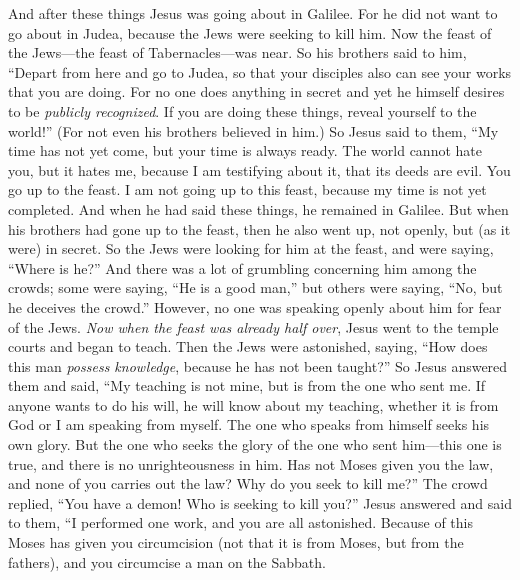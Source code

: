 \begin{biblechapter} %
 And after these things Jesus was going about in Galilee. For he did not want to go about in Judea, because the Jews were seeking to kill him.
\verse Now the feast of the Jews—the feast of Tabernacles—was near.
\verse So his brothers said to him, “Depart from here and go to Judea, so that your disciples also can see your works that you are doing.
\verse For no one does anything in secret and yet he himself desires to be \textit{publicly recognized}. If you are doing these things, reveal yourself to the world!”
\verse (For not even his brothers believed in him.)
 So Jesus said to them, “My time has not yet come, but your time is always ready.
\verse The world cannot hate you, but it hates me, because I am testifying about it, that its deeds are evil.
\verse You go up to the feast. I am not going up to this feast, because my time is not yet completed.
\verse And when he had said these things, he remained in Galilee.
\verse But when his brothers had gone up to the feast, then he also went up, not openly, but (as it were) in secret.
\verse So the Jews were looking for him at the feast, and were saying, “Where is he?”
\verse And there was a lot of grumbling concerning him among the crowds; some were saying, “He is a good man,” but others were saying, “No, but he deceives the crowd.”
\verse However, no one was speaking openly about him for fear of the Jews.
\verse \textit{Now when the feast was already half over}, Jesus went to the temple courts and began to teach.
\verse Then the Jews were astonished, saying, “How does this man \textit{possess knowledge}, because he has not been taught?”
\verse So Jesus answered them and said, “My teaching is not mine, but is from the one who sent me.
\verse If anyone wants to do his will, he will know about my teaching, whether it is from God or I am speaking from myself.
\verse The one who speaks from himself seeks his own glory. But the one who seeks the glory of the one who sent him—this one is true, and there is no unrighteousness in him.
\verse Has not Moses given you the law, and none of you carries out the law? Why do you seek to kill me?”
\verse The crowd replied, “You have a demon! Who is seeking to kill you?”
\verse Jesus answered and said to them, “I performed one work, and you are all astonished.
\verse Because of this Moses has given you circumcision (not that it is from Moses, but from the fathers), and you circumcise a man on the Sabbath.

\end{biblechapter}
